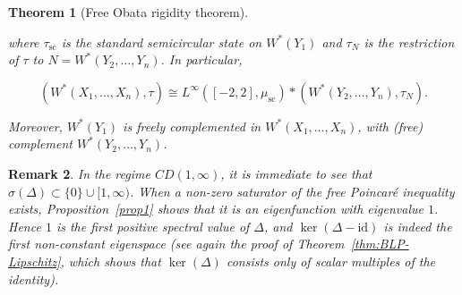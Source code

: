 \documentclass[10pt,a4paper,reqno]{amsart}
\newtheorem{theorem}{Theorem}[section]
\newtheorem{remark}[theorem]{Remark}
\begin{document}
\begin{theorem}[Free Obata rigidity theorem]
\begin{enumerate}
  where $\tau_{\mathrm{sc}}$ is the standard semicircular state on $W^\ast(Y_1)$
  and $\tau_N$ is the restriction of $\tau$ to $N=W^\ast(Y_2,\ldots,Y_n)$.
  In particular,
  

\[
      (W^\ast(X_1,\ldots,X_n),\tau)
      \cong
      L^\infty([-2,2],\mu_{\mathrm{sc}})
      *
      (W^\ast(Y_2,\ldots,Y_n),\tau_N).
  \]



\end{enumerate}

Moreover, $W^\ast(Y_1)$ is freely complemented in $W^\ast(X_1,\ldots,X_n)$, with
(free) complement $W^\ast(Y_2,\ldots,Y_n)$.
\end{theorem}




\begin{remark}
In the regime $CD(1,\infty)$, it is immediate to see that
$\sigma(\Delta)\subset\{0\}\cup[1,\infty)$.  
When a non-zero saturator of the free Poincaré inequality exists,
Proposition~\ref{prop1} shows that it is an eigenfunction with eigenvalue $1$.
Hence $1$ is the first positive spectral value of $\Delta$, and
$\ker(\Delta-\mathrm{id})$ is indeed the first non-constant eigenspace (see again
the proof of Theorem~\ref{thm:BLP-Lipschitz}, which shows that $\ker(\Delta)$
consists only of scalar multiples of the identity).
\end{remark}
\end{document}
